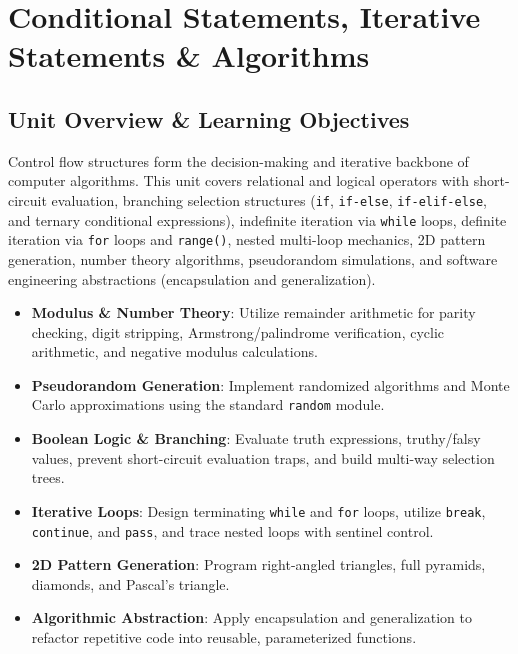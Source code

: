 \chapter{Conditional Statements, Iterative Statements \& Algorithms}
\label{chap:conditionals-loops-algorithms}

\section{Unit Overview \& Learning Objectives}

\begin{conceptbox}
Control flow structures form the decision-making and iterative backbone of computer algorithms. This unit covers relational and logical operators with short-circuit evaluation, branching selection structures (\texttt{if}, \texttt{if-else}, \texttt{if-elif-else}, and ternary conditional expressions), indefinite iteration via \texttt{while} loops, definite iteration via \texttt{for} loops and \texttt{range()}, nested multi-loop mechanics, 2D pattern generation, number theory algorithms, pseudorandom simulations, and software engineering abstractions (encapsulation and generalization).
\end{conceptbox}

\begin{itemize}[leftmargin=1.5em]
    \item \textbf{Modulus \& Number Theory}: Utilize remainder arithmetic for parity checking, digit stripping, Armstrong/palindrome verification, cyclic arithmetic, and negative modulus calculations.
    \item \textbf{Pseudorandom Generation}: Implement randomized algorithms and Monte Carlo approximations using the standard \texttt{random} module.
    \item \textbf{Boolean Logic \& Branching}: Evaluate truth expressions, truthy/falsy values, prevent short-circuit evaluation traps, and build multi-way selection trees.
    \item \textbf{Iterative Loops}: Design terminating \texttt{while} and \texttt{for} loops, utilize \texttt{break}, \texttt{continue}, and \texttt{pass}, and trace nested loops with sentinel control.
    \item \textbf{2D Pattern Generation}: Program right-angled triangles, full pyramids, diamonds, and Pascal's triangle.
    \item \textbf{Algorithmic Abstraction}: Apply encapsulation and generalization to refactor repetitive code into reusable, parameterized functions.
\end{itemize}

